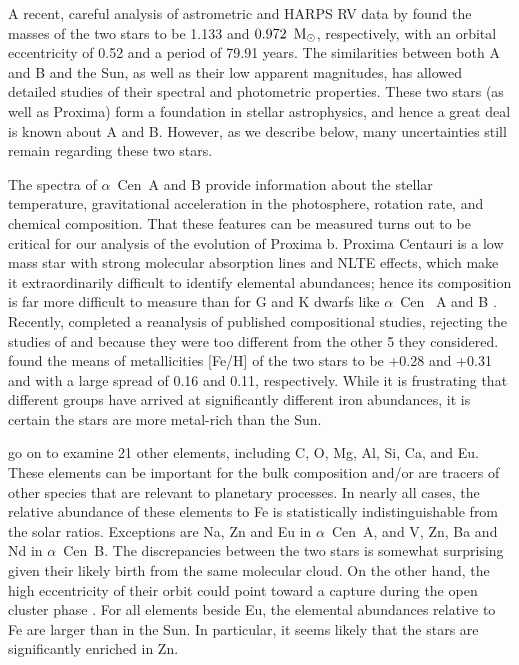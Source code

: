 \documentclass[preprint,12pt]{aastex}
\def\msun{{\rm\,M_\odot}}
\def\eg{{\it e.g.\ }}
\def\acen{{$\alpha$~Cen}}
\begin{document}
A recent, careful analysis of astrometric and HARPS RV data by
\cite{PourbaixBoffin16} found the masses of the two stars to be 1.133
and $0.972~\msun$, respectively, with an orbital eccentricity of 0.52
and a period of 79.91 years. The similarities between both A and B and
the Sun, as well as their low apparent magnitudes, has allowed
detailed studies of their spectral and photometric properties. These
two stars (as well as Proxima) form a foundation in stellar astrophysics,
and hence a great deal is known about A and B. However, as we describe
below, many uncertainties still remain regarding these two stars.

The spectra of \acen~A and B provide information about the stellar
temperature, gravitational acceleration in the photosphere, rotation
rate, and chemical composition. That these features can be
measured turns out to be critical for our analysis of the evolution of
Proxima b. Proxima Centauri is a low mass star with strong molecular
absorption lines and NLTE effects, which make it extraordinarily
difficult to identify elemental abundances; hence its composition
is far more difficult to measure than for G and K dwarfs like \acen~ A
and B \citep{Johnson2009}.  Recently, \cite{HinkelKane13} completed a
reanalysis of published compositional studies, rejecting the studies
of \cite{Laird85} and \cite{NeuforgeMagain97} because they were too
different from the other 5 they considered.  \cite{HinkelKane13}
  found the means of metallicities [Fe/H] of the two stars to be
+0.28 and +0.31 and with a large spread of 0.16 and 0.11,
respectively. While it is frustrating that different groups have
arrived at significantly different iron abundances, it is certain the
stars are more metal-rich than the Sun.

\cite{HinkelKane13} go on to examine 21 other elements, including C,
O, Mg, Al, Si, Ca, and Eu. These elements can be important for the
bulk composition and/or are tracers of other species that are relevant
to planetary processes. In nearly all cases, the relative abundance of
these elements to Fe is statistically indistinguishable from the solar
ratios. Exceptions are Na, Zn and Eu in \acen~A, and V, Zn, Ba
and Nd in \acen~B. The discrepancies between the two stars is
somewhat surprising given their likely birth from the same molecular
cloud. On the other hand, the high eccentricity of their orbit could
point toward a capture during the open cluster phase \citep[\eg][]{Malmberg07}. For all
elements beside Eu, the elemental abundances relative to Fe are larger
than in the Sun. In particular, it seems likely that the stars are
significantly enriched in Zn.
\end{document}
